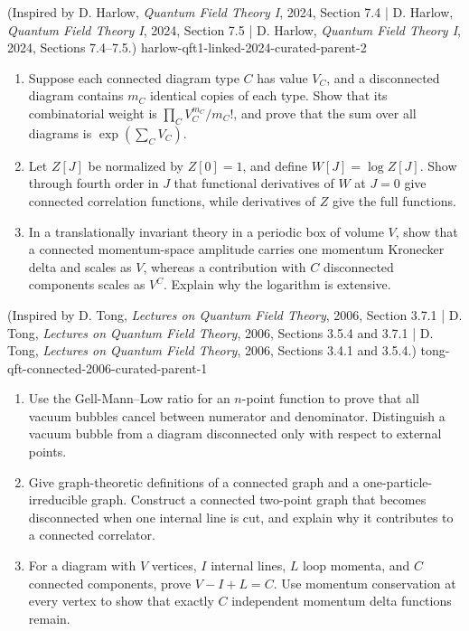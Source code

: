 \begin{enumerate}
  {(Inspired by D. Harlow, \emph{Quantum Field Theory I}, 2024, Section 7.4 | D. Harlow, \emph{Quantum Field Theory I}, 2024, Section 7.5 | D. Harlow, \emph{Quantum Field Theory I}, 2024, Sections 7.4--7.5.)}
  {harlow-qft1-linked-2024-curated-parent-2}
\begin{enumerate}
\item
Suppose each connected diagram type \(C\) has value \(V_C\), and a
disconnected diagram contains \(m_C\) identical copies of each type.
Show that its combinatorial weight is
\(\prod_C V_C^{m_C}/m_C!\), and prove that the sum over all diagrams is
\(\exp(\sum_CV_C)\).
\item
Let \(Z[J]\) be normalized by \(Z[0]=1\), and define \(W[J]=\log Z[J]\).
Show through fourth order in \(J\) that functional derivatives of \(W\)
at \(J=0\) give connected correlation functions, while derivatives of
\(Z\) give the full functions.
\item
In a translationally invariant theory in a periodic box of volume \(V\),
show that a connected momentum-space amplitude carries one momentum
Kronecker delta and scales as \(V\), whereas a contribution with \(C\)
disconnected components scales as \(V^C\).  Explain why the logarithm is
extensive.
\end{enumerate}

  {(Inspired by D. Tong, \emph{Lectures on Quantum Field Theory}, 2006, Section 3.7.1 | D. Tong, \emph{Lectures on Quantum Field Theory}, 2006, Sections 3.5.4 and 3.7.1 | D. Tong, \emph{Lectures on Quantum Field Theory}, 2006, Sections 3.4.1 and 3.5.4.)}
  {tong-qft-connected-2006-curated-parent-1}
\begin{enumerate}
\item
Use the Gell-Mann--Low ratio for an \(n\)-point function to prove that all
vacuum bubbles cancel between numerator and denominator.  Distinguish a
vacuum bubble from a diagram disconnected only with respect to external
points.
\item
Give graph-theoretic definitions of a connected graph and a
one-particle-irreducible graph.  Construct a connected two-point graph
that becomes disconnected when one internal line is cut, and explain why
it contributes to a connected correlator.
\item
For a diagram with \(V\) vertices, \(I\) internal lines, \(L\) loop
momenta, and \(C\) connected components, prove
\(V-I+L=C\).  Use momentum conservation at every vertex to show that
exactly \(C\) independent momentum delta functions remain.
\end{enumerate}


\end{enumerate}
